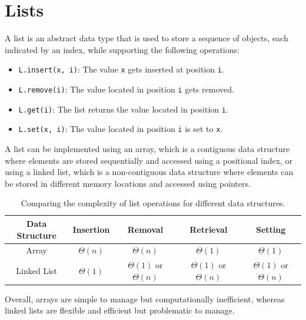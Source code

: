 \documentclass{report}
\begin{document}
\section{Lists}
A list is an abstract data type that is used to store a sequence of objects, each indicated by an index, while supporting the following operations:
\begin{itemize}
    \item \texttt{L.insert(x, i)}: The value \texttt{x} gets inserted at position \texttt{i}.
    \item \texttt{L.remove(i)}: The value located in position \texttt{i} gets removed.
    \item \texttt{L.get(i)}: The list returns the value located in position \texttt{i}.
    \item \texttt{L.set(x, i)}: The value located in position \texttt{i} is set to \texttt{x}.
\end{itemize}
A list can be implemented using an array, which is a contiguous data structure where elements are stored sequentially and accessed using a positional index, or using a linked list, which is a non-contiguous data structure where elements can be stored in different memory locations and accessed using pointers.
\begin{table}[H]
    \centering
    \begin{tabular}{|c|c|c|c|c|}
        \hline
        \textbf{Data Structure} & \textbf{Insertion} & \textbf{Removal} & \textbf{Retrieval} & \textbf{Setting} \\
        \hline
        Array & $\displaystyle \Theta(n)$ & $\displaystyle \Theta(n)$ & $\displaystyle \Theta(1)$ & $\displaystyle \Theta(1)$ \\
        \hline
        Linked List & $\displaystyle \Theta(1)$ & $\displaystyle \Theta(1)$ or $\displaystyle \Theta(n)$ & $\displaystyle \Theta(1)$ or $\displaystyle \Theta(n)$ & $\displaystyle \Theta(1)$ or $\displaystyle \Theta(n)$ \\
        \hline
    \end{tabular}
    \caption{Comparing the complexity of list operations for different data structures.}
    \label{tab:list_complexity}
\end{table}
\noindent Overall, arrays are simple to manage but computationally inefficient, whereas linked lists are flexible and efficient but problematic to manage.
\end{document}
